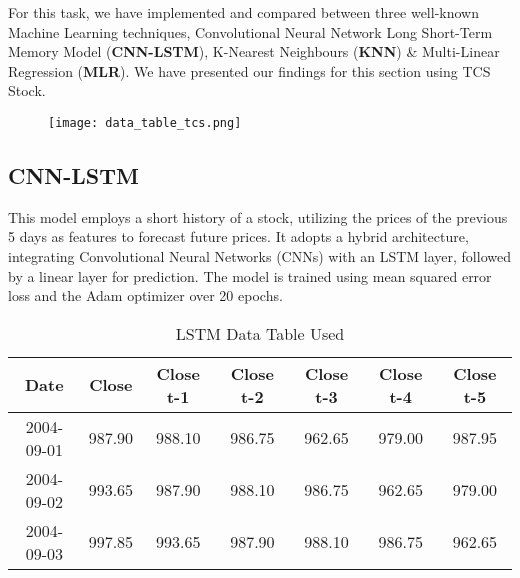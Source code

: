 \documentclass{article}
\begin{document}
For this task, we have implemented and compared between three well-known Machine Learning techniques, Convolutional Neural Network Long Short-Term Memory Model (\textbf{CNN-LSTM}), K-Nearest Neighbours (\textbf{KNN}) \& Multi-Linear Regression (\textbf{MLR}). We have presented our findings for this section using TCS Stock.

\begin{figure}[H]
    \centering
    \texttt{[image: data\_table\_tcs.png]}
    \label{fig:enter-label}
\end{figure}

\subsection{CNN-LSTM}

This model employs a short history of a stock, utilizing the prices of the previous 5 days as features to forecast future prices. It adopts a hybrid architecture, integrating Convolutional Neural Networks (CNNs) with an LSTM layer, followed by a linear layer for prediction. The model is trained using mean squared error loss and the Adam optimizer over 20 epochs.

\begin{table}[htbp]
    \centering
    \caption{LSTM Data Table Used}
    \label{tab:close_history}
    \begin{tabular}{ccccccc}
        \toprule
        Date & Close & Close t-1 & Close t-2 & Close t-3 & Close t-4 & Close t-5 \\
        \midrule
        2004-09-01 & 987.90 & 988.10 & 986.75 & 962.65 & 979.00 & 987.95 \\
        2004-09-02 & 993.65 & 987.90 & 988.10 & 986.75 & 962.65 & 979.00 \\
        2004-09-03 & 997.85 & 993.65 & 987.90 & 988.10 & 986.75 & 962.65 \\
        \bottomrule
    \end{tabular}
\end{table}

\end{document}
